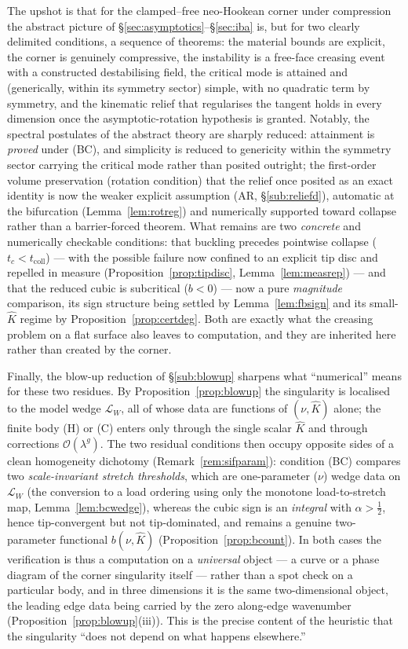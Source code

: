 The upshot is that for the clamped--free neo-Hookean corner under compression the abstract picture of
\S\ref{sec:asymptotics}--\S\ref{sec:iba} is, but for two clearly delimited conditions, a sequence of theorems: the
material bounds are explicit, the corner is genuinely compressive, the instability is a free-face creasing event with a
constructed destabilising field, the critical mode is attained and (generically, within its symmetry sector) simple,
with no quadratic term by symmetry, and the kinematic relief that regularises the tangent holds in every dimension once
the asymptotic-rotation hypothesis is granted. Notably, the spectral postulates of the abstract theory are sharply
reduced: attainment is \emph{proved} under (BC), and simplicity is reduced to genericity within the symmetry sector
carrying the critical mode rather than posited outright; the first-order volume preservation (rotation condition) that
the relief once posited as an exact identity is now the weaker explicit assumption (AR, \S\ref{sub:reliefd}), automatic
at the bifurcation (Lemma~\ref{lem:rotreg}) and numerically supported toward collapse rather than a barrier-forced
theorem. What remains are two \emph{concrete} and numerically checkable conditions: that buckling precedes pointwise
collapse ($t_c<t_{\mathrm{coll}}$) --- with the possible failure now confined to an explicit tip disc and repelled in
measure (Proposition~\ref{prop:tipdisc}, Lemma~\ref{lem:measrep}) --- and that the reduced cubic is subcritical
($b<0$) --- now a pure \emph{magnitude} comparison, its sign structure being settled by Lemma~\ref{lem:fbsign} and its
small-$\hat K$ regime by Proposition~\ref{prop:certdeg}. Both are exactly what the
creasing problem on a flat surface also leaves to computation, and they are inherited here rather than created by the
corner.

Finally, the blow-up reduction of \S\ref{sub:blowup} sharpens what ``numerical'' means for these two residues. By
Proposition~\ref{prop:blowup} the singularity is localised to the model wedge $\mathcal{L}_W$, all of whose data are
functions of $(\nu,\hat K)$ alone; the finite body (H) or (C) enters only through the single scalar $\hat K$ and
through corrections $\mathcal{O}(\lambda^{g})$. The two residual conditions then occupy opposite sides of a clean
homogeneity dichotomy (Remark~\ref{rem:sifparam}): condition (BC) compares two \emph{scale-invariant stretch
    thresholds}, which are one-parameter ($\nu$) wedge data on $\mathcal{L}_W$ (the conversion to a load ordering using
only the monotone load-to-stretch map, Lemma~\ref{lem:bcwedge}), whereas the cubic sign is an \emph{integral} with
$\alpha>\tfrac12$, hence tip-convergent but not tip-dominated, and remains a genuine two-parameter functional
$b(\nu,\hat K)$ (Proposition~\ref{prop:bcount}). In both cases the verification is thus a computation on a
\emph{universal} object --- a curve or a phase diagram of the corner singularity itself --- rather than a spot check on
a particular body, and in three dimensions it is the same two-dimensional object, the leading edge data being carried
by the zero along-edge wavenumber (Proposition~\ref{prop:blowup}(iii)). This is the precise content of the heuristic
that the singularity ``does not depend on what happens elsewhere.''
